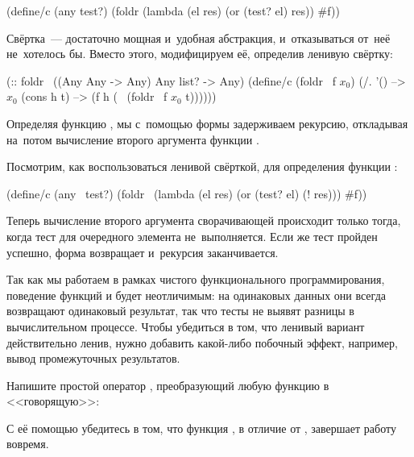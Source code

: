 \begin{Definition}[emph={el,res,test?,lst}]
(define/c (any test?)
  (foldr (lambda (el res) (or (test? el) res)) #f))
\end{Definition}

Свёртка~--- достаточно мощная и~удобная абстракция, и~отказываться от~неё не~хотелось бы. Вместо этого, модифицируем её, определив ленивую свёртку:

\begin{Definition}[emph={f,lst,h,t}]
(:: foldr~ ((Any Any -> Any) Any list? -> Any)
 (define/c (foldr~ f $x_0$)
   (/. '() --> $x_0$
       (cons h t) --> (f h (~ (foldr~ f $x_0$ t))))))
\end{Definition}
Определяя функцию , мы с~помощью формы \s{~} задерживаем рекурсию, откладывая на~потом вычисление второго аргумента функции .

Посмотрим, как воспользоваться ленивой свёрткой, для определения функции :

\begin{Definition}[emph={test?,lst,el,res}]
(define/c (any~ test?)
  (foldr~ (lambda (el res) (or (test? el) (! res))) #f))
\end{Definition}
Теперь вычисление второго аргумента сворачивающей  происходит только тогда, когда тест для очередного элемента не~выполняется. Если же тест пройден успешно, форма  возвращает  и~рекурсия заканчивается.
\newpage

\begin{Assignment}
Так как мы работаем в рамках чистого функционального программирования, поведение функций  и  будет неотличимым: на одинаковых данных они всегда возвращают одинаковый результат, так что тесты не выявят разницы в вычислительном процессе. Чтобы убедиться в том, что ленивый вариант действительно ленив, нужно добавить какой-либо побочный эффект, например, вывод промежуточных результатов. 

Напишите простой оператор , преобразующий любую функцию  в <<говорящую>>:
\vspace{-\smallskipamount}
\vspace{-\smallskipamount}
\vspace{-\smallskipamount}
\vspace{-\smallskipamount}

С её помощью убедитесь в том, что функция , в отличие от , завершает работу вовремя.

\end{Assignment}

